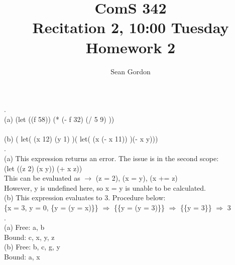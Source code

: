\documentclass[12pt]{article}
\title{ComS 342\\Recitation 2, 10:00 Tuesday\\Homework 2}
\author{Sean Gordon}
\begin{document}
\maketitle


.\\
\indent (a) (let ((f 58)) (* (- f 32) (/ 5 9) ))\\\\
\indent (b) ( let( (x 12) (y 1) )( let( (x (- x 11)) )(- x y)))\\


.\\
\indent (a) This expression returns an error. The issue is in the second scope:\\
\indent \indent (let ((z 2) (x y)) (+ x z))\\
\indent \indent This can be evaluated as $\to$ (z = 2), (x = y), (x += z)\\
\indent \indent However, y is undefined here, so x = y is unable to be calculated.\\

\indent (b) This expression evaluates to 3. Procedure below:\\
\indent \indent \{x = 3, y = 0, \{y = (y = x)\}\} $\Rightarrow$ \{\{y = (y = 3)\}\} $\Rightarrow$ \{\{y = 3\}\} $\Rightarrow$ 3\\

.\\
\indent (a) Free: a, b\\
\indent \indent Bound: c, x, y, z\\

\indent (b) Free: b, c, g, y\\
\indent \indent Bound: a, x\\



\end{document}
